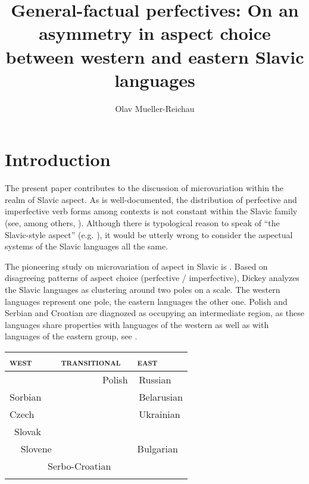 \documentclass[output=paper,
modfonts,
newtxmath,
hidelinks
]{langscibook}
\title{General-factual perfectives: On an asymmetry in aspect choice between western and eastern Slavic languages}
\author{%
 Olav Mueller-Reichau\affiliation{University of Leipzig}
}
\begin{document}
\maketitle
{}

\section{Introduction}\label{13:s1} 

The present paper contributes to the discussion of microvariation within the realm of Slavic aspect. 
As is well-documented, the distribution 
of perfective and imperfective verb forms among contexts is not constant within the Slavic family (see, among others, \citealt{Stunova1991,Stunova1993,Breu2000ZurPositiondes,Petruchina2000,Dickey2000,Dickey15,Dickey18,Gehrke02,Wiemer08,Rivero10,Alvestad13,Gattnar13,Berger13,Rivero14,Duebbers15,FK15,FK18}).
Although there is typological reason to speak of ``the Slavic-style aspect'' (e.g. \citealt{Dahl85,Plungjan11}),
it would be utterly wrong to consider the aspectual systems of the Slavic languages all the same. 

The pioneering study on microvariation of aspect in Slavic is \citet{Dickey2000}. Based on disagreeing patterns of aspect choice (perfective / imperfective),
Dickey analyzes the Slavic languages as clustering around two poles on a scale. The western languages represent one pole, the eastern languages the other one. 
Polish and Serbian and Croatian are diagnozed as occupying an intermediate region, as these languages share properties with languages of the western as well as with 
languages of the eastern group, see .




\begin{table}
\centering
      \label{13:sd1}
      \begin{tabularx}{0.6\textwidth}{l l l}
\lsptoprule \textsc{west} & \textsc{transitional} & \textsc{east}\\
\midrule     &  $\quad\quad\quad\quad$ Polish & $\,$Russian \\
   Sorbian  &    & $\,$Belarusian \\
    Czech  &    &  $\,$Ukrainian\\ 
  $\,$  Slovak  &    &  \\
   $\,\,\,\,\,$  Slovene  &    & Bulgarian \\
        \multicolumn{2}{l}{$\quad\quad\quad\quad$Serbo-Croatian} & \\
\lspbottomrule
\end{tabularx}
\end{table}
\end{document}
